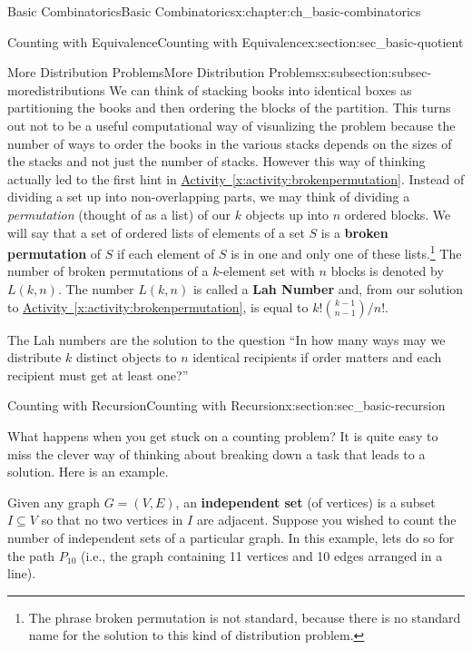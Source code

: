 \documentclass[oneside,10pt,]{book}
\newcommand{\terminology}[1]{\textbf{#1}}
\numberwithin{equation}{chapter}
\begin{document}
\begin{chapterptx}{Basic Combinatorics}{}{Basic Combinatorics}{}{}{x:chapter:ch_basic-combinatorics}
\begin{sectionptx}{Counting with Equivalence}{}{Counting with Equivalence}{}{}{x:section:sec_basic-quotient}
\begin{subsectionptx}{More Distribution Problems}{}{More Distribution Problems}{}{}{x:subsection:subsec-moredistributions}
We can think of stacking books into identical boxes as partitioning the books and then ordering the blocks of the partition. This turns out not to be a useful computational way of visualizing the problem because the number of ways to order the books in the various stacks depends on the sizes of the stacks and not just the number of stacks. However this way of thinking actually led to the first hint in \hyperref[x:activity:brokenpermutation]{Activity~\ref{x:activity:brokenpermutation}}. Instead of dividing a set up into non-overlapping parts, we may think of dividing a \emph{permutation} (thought of as a list) of our \(k\) objects up into \(n\) ordered blocks. We will say that a set of ordered lists of elements of a set \(S\) is a \terminology{broken permutation}   of \(S\) if each element of \(S\) is in one and only one of these lists.\footnote{The phrase broken permutation is not standard, because there is no standard name for the solution to this kind  of distribution problem.\label{g:fn:idm2462}} The number of broken permutations of a \(k\)-element set with \(n\) blocks is denoted by \(L(k,n)\). The number \(L(k,n)\) is called a \terminology{Lah Number} and, from our solution to \hyperref[x:activity:brokenpermutation]{Activity~\ref{x:activity:brokenpermutation}}, is equal to \(k!\binom{k-1}{n-1}/n!\).%
\par
The Lah numbers are the solution to the question ``In how many ways may we distribute \(k\) distinct objects to \(n\) identical recipients if order matters and each recipient must get at least one?''%
\end{subsectionptx}
\end{sectionptx}
%
%
\typeout{************************************************}
\typeout{************************************************}
%
\begin{sectionptx}{Counting with Recursion}{}{Counting with Recursion}{}{}{x:section:sec_basic-recursion}
\begin{introduction}{}%
What happens when you get stuck on a counting problem?  It is quite easy to miss the clever way of thinking about breaking down a task that leads to a solution.  Here is an example.%
\par
Given any graph \(G = (V, E)\), an \terminology{independent set} (of vertices) is a subset \(I \subseteq V\) so that no two vertices in \(I\) are adjacent.  Suppose you wished to count the number of independent sets of a particular graph.  In this example, lets do so for the path \(P_{10}\) (i.e., the graph containing 11 vertices and 10 edges arranged in a line).%

\end{introduction}
\end{sectionptx}
\end{chapterptx}
\end{document}

